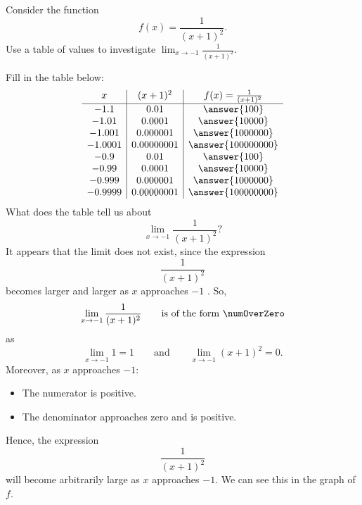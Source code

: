 \documentclass{ximera}
\begin{document}
\begin{example}
Consider the function
  \[
  f(x) = \frac{1}{(x+1)^2}.
  \]
  Use a table of values to investigate $\lim_{x\to -1} \frac{1}{(x+1)^2}$.
  \begin{explanation}
    Fill in the table below:
    \[
    \begin{array}{c|c|c}
      x & (x+1)^{2} & f(x) = \frac{1}{(x+1)^2}\\ \hline
      -1.1    & 0.01       & \answer{100} \\
      -1.01   & 0.0001     & \answer{10000} \\
      -1.001  & 0.000001   & \answer{1000000} \\
      -1.0001 & 0.00000001 & \answer{100000000} \\
      -0.9    & 0.01       & \answer{100} \\
      -0.99   & 0.0001     & \answer{10000} \\
      -0.999  & 0.000001   & \answer{1000000} \\
      -0.9999 & 0.00000001 & \answer{100000000} \\
    \end{array}
    \]
    What does the table tell us about 
    \[
    \lim_{x\to -1} \frac{1}{(x+1)^2}?
    \]
    It appears that the limit  does not exist, since the expression
    \[
    \frac{1}{(x+1)^2}
    \]
    becomes larger and larger as  $x$ approaches $-1$ . So,
    \[
    \lim_{x\to -1} \frac{1}{(x+1)^2}\qquad\text{is of the form }\numOverZero
    \]
    as
    \[
    \lim_{x\to -1} 1 = 1 \qquad\text{and}\qquad \lim_{x\to -1}(x+1)^2 = 0.
    \]
    Moreover, as $x$ approaches $-1$:
    \begin{itemize}
    \item The numerator is positive.
    \item The denominator approaches zero and is positive.
    \end{itemize}
    Hence, the expression
    \[
    \frac{1}{(x+1)^2}
    \]
    will become arbitrarily large as $x$ approaches $-1$.  We can see this
    in the graph of $f$.
    \begin{image}
    \end{image}
  \end{explanation}
\end{example}
\end{document}
